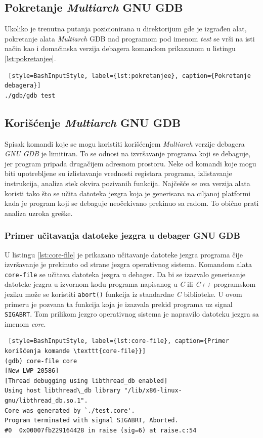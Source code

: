 \documentclass[12pt,oneside]{memoir}
\begin{document}
\subsection{Pokretanje \emph{Multiarch} GNU GDB}

Ukoliko je trenutna putanja pozicionirana u direktorijum gde je izgrađen alat, pokretanje alata \emph{Multiarch} GDB nad programom pod imenom \emph{test} se vrši na isti način kao i domaćinska verzija debagera komandom prikazanom u listingu \ref{lst:pokretanjee}.
\begin{lstlisting} [style=BashInputStyle, label={lst:pokretanjee}, caption={Pokretanje debagera}]
./gdb/gdb test

\end{lstlisting}

\subsection{Korišćenje \emph{Multiarch} GNU GDB}

Spisak komandi koje se mogu koristiti korišćenjem \emph{Multiarch} verzije debagera \emph{GNU GDB} je limitiran. To se odnosi na izvršavanje programa koji se debaguje, jer program pripada drugačijem adresnom prostoru. Neke od komandi koje mogu biti upotrebljene su izlistavanje vrednosti registara programa, izlistavanje instrukcija, analiza stek okvira pozivanih funkcija. Najčešće se ova verzija alata koristi tako što se učita datoteka jezgra koja je generisana na ciljanoj platformi kada je program koji se debaguje neočekivano prekinuo sa radom. To obično prati analiza uzroka greške.

\subsubsection{Primer učitavanja datoteke jezgra u debager GNU GDB}

U listingu \ref{lst:core-file} je prikazano učitavanje datoteke jezgra programa čije izvršavanje je prekinuto od strane jezgra operativnog sistema. Komandom alata \texttt{core-file} se učitava datoteka jezgra u debager. Da bi se izazvalo generisanje datoteke jezgra u izvornom kodu programa napisanog u \emph{C} ili \emph{C++} programskom jeziku može se koristiti \texttt{abort()} funkcija iz standardne \emph{C} biblioteke. U ovom primeru je pozvana ta funkcija koja je izazvala prekid programa uz signal \texttt{SIGABRT}. Tom prilikom jezgro operativnog sistema je napravilo datoteku jezgra sa imenom \emph{core}.
\begin{lstlisting} [style=BashInputStyle, label={lst:core-file}, caption={Primer korišćenja komande \texttt{core-file}}]
(gdb) core-file core
[New LWP 20586]
[Thread debugging using libthread_db enabled]
Using host libthread\_db library "/lib/x86-linux-gnu/libthread_db.so.1".
Core was generated by `./test.core'.
Program terminated with signal SIGABRT, Aborted.
#0  0x00007fb229164428 in raise (sig=6) at raise.c:54
\end{lstlisting}
\end{document}

